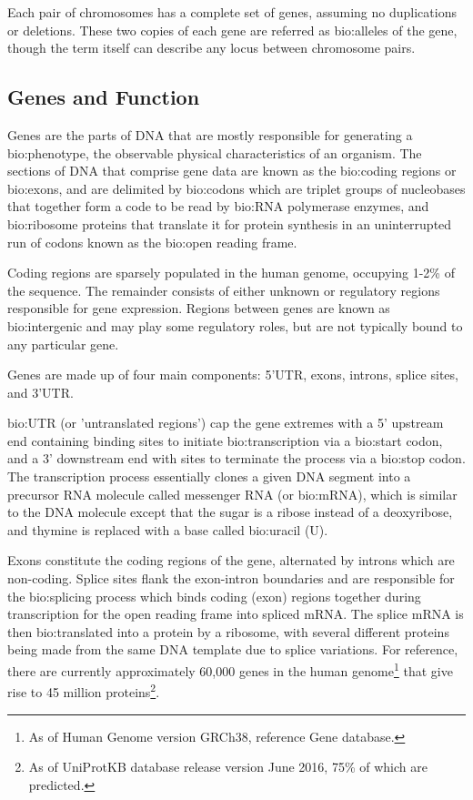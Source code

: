 Each pair of chromosomes has a complete set of genes, assuming no duplications or deletions. These two copies of each gene are referred as \gls{bio:alleles} of the gene, though the term itself can describe any locus between chromosome pairs.


\subsection{Genes and Function}

Genes are the parts of DNA that are mostly responsible for generating a \gls{bio:phenotype}, the observable physical characteristics of an organism. The sections of DNA that comprise gene data are known as the \gls{bio:coding} regions or \gls{bio:exons}, and are delimited by \gls{bio:codons} which are triplet groups of nucleobases that together form a code to be read by \gls{bio:RNA polymerase} enzymes, and \gls{bio:ribosome} proteins that translate it for protein synthesis in an uninterrupted run of codons known as the \gls{bio:open reading frame}.

Coding regions are sparsely populated in the human genome, occupying 1-2\% of the sequence. The remainder consists of either unknown or regulatory regions responsible for gene expression. Regions between genes are known as \gls{bio:intergenic} and may play some regulatory roles, but are not typically bound to any particular gene.

Genes are made up of four main components: 5'UTR, exons, introns, splice sites, and 3'UTR.

\gls{bio:UTR} (or 'untranslated regions') cap the gene extremes with a 5' upstream end containing binding sites to initiate \gls{bio:transcription} via a \gls{bio:start codon}, and a 3' downstream end with sites to terminate the process via a \gls{bio:stop codon}. The transcription process essentially clones a given DNA segment into a precursor RNA molecule called messenger RNA (or \gls{bio:mRNA}), which is similar to the DNA molecule except that the sugar is a ribose instead of a deoxyribose, and thymine is replaced with a base called \gls{bio:uracil} (U).

Exons constitute the coding regions of the gene, alternated by introns which are non-coding. Splice sites flank the exon-intron boundaries and are responsible for the \gls{bio:splicing} process which binds coding (exon) regions together during transcription for the open reading frame into spliced mRNA.  The splice mRNA is then \gls{bio:translated} into a protein by a ribosome, with several different proteins being made from the same DNA template due to splice variations. For reference, there are currently approximately 60,000 genes in the human genome\footnote{As of Human Genome version GRCh38, reference Gene database.}  that give rise to 45 million proteins\footnote{As of UniProtKB database release  version June 2016, 75\% of which are predicted\citep{uniprot2008universal}.}.

